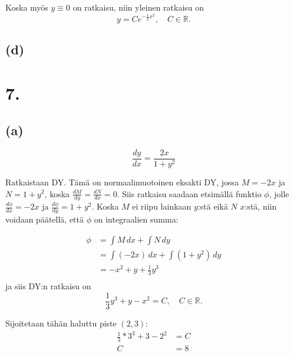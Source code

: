 \documentclass{article}
\begin{document}
Koska myös $y \equiv 0$ on ratkaisu, niin yleinen ratkaisu on
\[
  y = Ce^{-\frac{1}{2}x^2}, \quad C \in \mathbb{R}.
\]

\subsection*{(d)}

\begin{center}
\end{center}

\section*{7.}

\subsection*{(a)}

\[
  \frac{dy}{dx} = \frac{2x}{1 + y^2}
\]

Ratkaistaan DY. Tämä on normaalimuotoinen eksakti DY, jossa $M = -2x$ ja $N = 1
+ y^2$, koska $\frac{dM}{dy} = \frac{dN}{dx} = 0$.  Siis ratkaisu saadaan
etsimällä funktio $\phi$, jolle $\frac{d\phi}{dx} = -2x$ ja $\frac{d\phi}{dy} =
1 + y^2$. Koska $M$ ei riipu lainkaan $y$:stä eikä $N$ $x$:stä, niin voidaan
päätellä, että $\phi$ on integraalien summa:

\begin{align*}
  \phi &= \int M\,dx + \int N\,dy \\
       &= \int (-2x)\,dx + \int (1 + y^2)\,dy \\
       &= -x^2 + y + \frac{1}{3}y^3 \\
\end{align*}
ja siis DY:n ratkaisu on
\[
  \frac{1}{3}y^3 + y - x^2 = C, \quad C \in \mathbb{R}.
\]

Sijoitetaan tähän haluttu piste $(2, 3)$:
\begin{align*}
  \frac{1}{3}*3^3 + 3 - 2^2 &= C \\
  C &= 8 \\
\end{align*}
\end{document}
